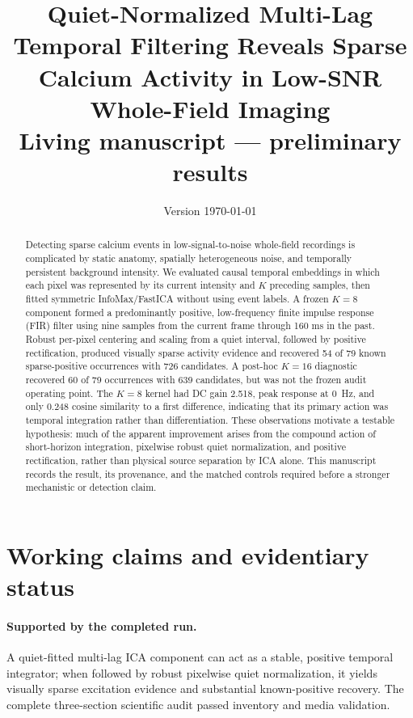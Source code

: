 \documentclass[11pt]{article}
\title{Quiet-Normalized Multi-Lag Temporal Filtering Reveals Sparse Calcium Activity in Low-SNR Whole-Field Imaging\\\large Living manuscript --- preliminary results}
\author{\todo{Author list and affiliations}}
\date{Version \today}
\begin{document}
\maketitle

\begin{abstract}
Detecting sparse calcium events in low-signal-to-noise whole-field recordings is complicated by static anatomy, spatially heterogeneous noise, and temporally persistent background intensity. We evaluated causal temporal embeddings in which each pixel was represented by its current intensity and $K$ preceding samples, then fitted symmetric InfoMax/FastICA without using event labels. A frozen $K=8$ component formed a predominantly positive, low-frequency finite impulse response (FIR) filter using nine samples from the current frame through 160 ms in the past. Robust per-pixel centering and scaling from a quiet interval, followed by positive rectification, produced visually sparse activity evidence and recovered 54 of 79 known sparse-positive occurrences with 726 candidates. A post-hoc $K=16$ diagnostic recovered 60 of 79 occurrences with 639 candidates, but was not the frozen audit operating point. The $K=8$ kernel had DC gain 2.518, peak response at \SI{0}{Hz}, and only 0.248 cosine similarity to a first difference, indicating that its primary action was temporal integration rather than differentiation. These observations motivate a testable hypothesis: much of the apparent improvement arises from the compound action of short-horizon integration, pixelwise robust quiet normalization, and positive rectification, rather than physical source separation by ICA alone. This manuscript records the result, its provenance, and the matched controls required before a stronger mechanistic or detection claim.
\end{abstract}

\section{Working claims and evidentiary status}
\paragraph{Supported by the completed run.}
A quiet-fitted multi-lag ICA component can act as a stable, positive temporal integrator; when followed by robust pixelwise quiet normalization, it yields visually sparse excitation evidence and substantial known-positive recovery. The complete three-section scientific audit passed inventory and media validation.
\end{document}
